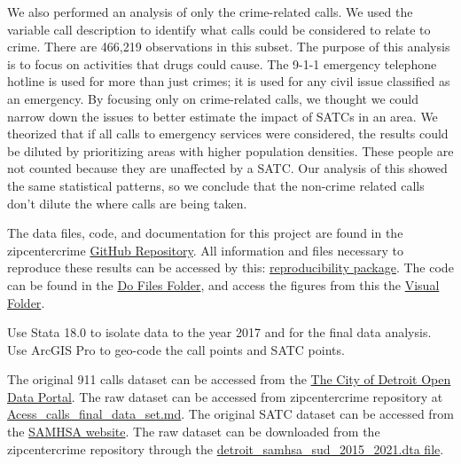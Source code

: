 \documentclass[12pt]{article}
\begin{document}
We also performed an analysis of only the crime-related calls. We used the variable call description to identify what calls could be considered to relate to crime. There are 466,219 observations in this subset. The purpose of this analysis is to focus on activities that drugs could cause. The 9-1-1 emergency telephone hotline is used for more than just crimes; it is used for any civil issue classified as an emergency. By focusing only on crime-related calls, we thought we could narrow down the issues to better estimate the impact of SATCs in an area. We theorized that if all calls to emergency services were considered, the results could be diluted by prioritizing areas with higher population densities. These people are not counted because they are unaffected by a SATC. Our analysis of this showed the same statistical patterns, so we conclude that the non-crime related calls don't dilute the where calls are being taken. 

The data files, code, and documentation for this project are found in the zipcentercrime \href{https://github.com/ecn310/course-project-zipcentercrime}{GitHub Repository}. All information and files necessary to reproduce these results can be accessed by this: \href{https://github.com/ecn310/course-project-zipcentercrime/tree/main/Reproducibility%20Package}{reproducibility package}. The code can be found in the \href{https://github.com/ecn310/course-project-zipcentercrime/tree/main/Reproducibility%20Package/Downloaded_calls/Do_files}{Do Files Folder}, and access the figures from this the \href{https://github.com/ecn310/course-project-zipcentercrime/tree/main/Reproducibility%20Package/Downloaded_calls/Visual_Graphics_Downloaded_calls}{Visual Folder}. 

Use Stata 18.0 to isolate data to the year 2017 and for the final data analysis. Use ArcGIS Pro to geo-code the call points and SATC points. 

The original 911 calls dataset can be accessed from the \href{https://data.detroitmi.gov}{The City of Detroit Open Data Portal}. The raw dataset can be accessed from zipcentercrime repository at \href{https://github.com/ecn310/course-project-zipcentercrime/blob/main/Reproducibility%20Package/RawData/Acess_calls_final_data_set.md}{Acess\_calls\_final\_data\_set.md}. The original SATC dataset can be accessed from the \href{https://www.samhsa.gov}{SAMHSA website}. The raw dataset can be downloaded from the zipcentercrime repository through the \href{https://github.com/ecn310/course-project-zipcentercrime/blob/main/Reproducibility%20Package/RawData/detroit_samhsa_sud_2015_2021.dta}{detroit\_samhsa\_sud\_2015\_2021.dta file}.
\end{document}
